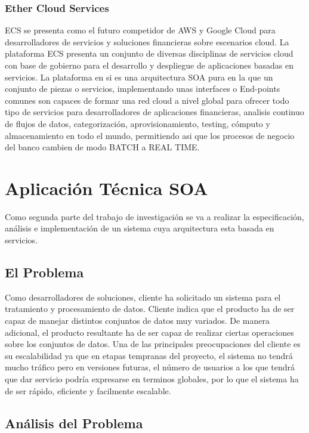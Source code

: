 \documentclass[a4paper,11pt]{book}
\begin{document}
\subsection{Ether Cloud Services}

ECS se presenta como el futuro competidor de AWS y Google Cloud para desarrolladores de servicios y soluciones financieras sobre escenarios cloud. La plataforma ECS presenta un conjunto de diversas disciplinas de servicios cloud con base de gobierno para el desarrollo y despliegue de aplicaciones basadas en servicios. La plataforma en si es una arquitectura SOA pura en la que un conjunto de piezas o servicios, implementando unas interfaces o End-points comunes son capaces de formar una red cloud a nivel global para ofrecer todo tipo de servicios para desarrolladores de aplicaciones financieras, analisis continuo de flujos de datos, categorización, aprovisionamiento, testing, cómputo y almacenamiento en todo el mundo, permitiendo asi que los procesos de negocio del banco cambien de modo BATCH a REAL TIME.  

\chapter{Aplicación Técnica SOA}

Como segunda parte del trabajo de investigación se va a realizar la especificación, análisis e implementación de un sistema cuya arquitectura esta basada en servicios. 

\section{El Problema}

Como desarrolladores de soluciones, cliente ha solicitado un sistema para el tratamiento y procesamiento de datos. Cliente indica que el producto ha de ser capaz de manejar distintos conjuntos de datos muy variados. De manera adicional, el producto resultante ha de ser capaz de realizar ciertas operaciones sobre los conjuntos de datos. Una de las principales preocupaciones del cliente es su escalabilidad ya que en etapas tempranas del proyecto, el sistema no tendrá mucho tráfico pero en versiones futuras, el número de usuarios a los que tendrá que dar servicio podría expresarse en terminos globales, por lo que el sistema ha de ser rápido, eficiente y facilmente escalable.

\section{Análisis del Problema}
\end{document}
